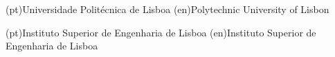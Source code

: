 %

\ncuniversity*(pt){Universidade Politécnica de Lisboa}
\ncuniversity*(en){Polytechnic University of Lisbon}

\ncschool*(pt){Instituto Superior de Engenharia de Lisboa}
\ncschool*(en){Instituto Superior de Engenharia de Lisboa}

